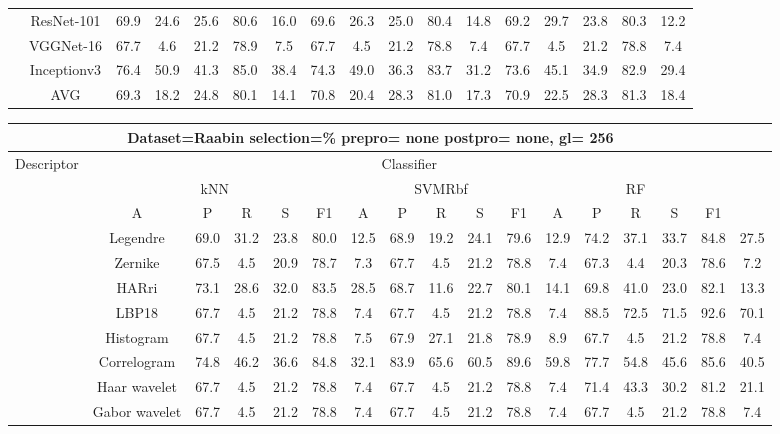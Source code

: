 \documentclass[12pt,italian]{article}
\begin{document}
\begin{tiny}
\begin{longtable}{lcccccccccccccccc}
& ResNet-101 & 69.9 & 24.6 & 25.6 & 80.6 & 16.0 & 69.6 & 26.3 & 25.0 & 80.4 & 14.8 & 69.2 & 29.7 & 23.8 & 80.3 & 12.2 \\ 
& VGGNet-16 & 67.7 &  4.6 & 21.2 & 78.9 &  7.5 & 67.7 &  4.5 & 21.2 & 78.8 &  7.4 & 67.7 &  4.5 & 21.2 & 78.8 &  7.4 \\ 
& Inceptionv3 & 76.4 & 50.9 & 41.3 & 85.0 & 38.4 & 74.3 & 49.0 & 36.3 & 83.7 & 31.2 & 73.6 & 45.1 & 34.9 & 82.9 & 29.4 \\ 
\hline
& AVG & 69.3 & 18.2 & 24.8 & 80.1 & 14.1 & 70.8 & 20.4 & 28.3 & 81.0 & 17.3 & 70.9 & 22.5 & 28.3 & 81.3 & 18.4 \\ 
\hline
\bottomrule
\end{longtable} 

 \pagebreak 
\begin{longtable}{lcccccccccccccccc}
\toprule
\multicolumn{16}{c}{Dataset=Raabin selection=\% prepro= none postpro= none, gl= 256} \\ 
\toprule
Descriptor & \multicolumn{15}{c}{Classifier} \\ 
& \multicolumn{5}{c}{kNN} & \multicolumn{5}{c}{SVMRbf} & \multicolumn{5}{c}{RF} \\ 
& A & P & R & S & F1 & A & P & R & S & F1 & A & P & R & S & F1 \\ 
\midrule
& Legendre & 69.0 & 31.2 & 23.8 & 80.0 & 12.5 & 68.9 & 19.2 & 24.1 & 79.6 & 12.9 & 74.2 & 37.1 & 33.7 & 84.8 & 27.5 \\ 
& Zernike & 67.5 &  4.5 & 20.9 & 78.7 &  7.3 & 67.7 &  4.5 & 21.2 & 78.8 &  7.4 & 67.3 &  4.4 & 20.3 & 78.6 &  7.2 \\ 
& HARri & 73.1 & 28.6 & 32.0 & 83.5 & 28.5 & 68.7 & 11.6 & 22.7 & 80.1 & 14.1 & 69.8 & 41.0 & 23.0 & 82.1 & 13.3 \\ 
& LBP18 & 67.7 &  4.5 & 21.2 & 78.8 &  7.4 & 67.7 &  4.5 & 21.2 & 78.8 &  7.4 & 88.5 & 72.5 & 71.5 & 92.6 & 70.1 \\ 
& Histogram & 67.7 &  4.5 & 21.2 & 78.8 &  7.5 & 67.9 & 27.1 & 21.8 & 78.9 &  8.9 & 67.7 &  4.5 & 21.2 & 78.8 &  7.4 \\ 
& Correlogram & 74.8 & 46.2 & 36.6 & 84.8 & 32.1 & 83.9 & 65.6 & 60.5 & 89.6 & 59.8 & 77.7 & 54.8 & 45.6 & 85.6 & 40.5 \\ 
& Haar wavelet & 67.7 &  4.5 & 21.2 & 78.8 &  7.4 & 67.7 &  4.5 & 21.2 & 78.8 &  7.4 & 71.4 & 43.3 & 30.2 & 81.2 & 21.1 \\ 
& Gabor wavelet & 67.7 &  4.5 & 21.2 & 78.8 &  7.4 & 67.7 &  4.5 & 21.2 & 78.8 &  7.4 & 67.7 &  4.5 & 21.2 & 78.8 &  7.4 \\ 

\end{longtable}
\end{tiny}
\end{document}
